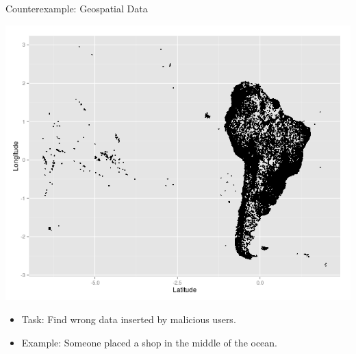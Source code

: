 \documentclass{beamer}
\begin{document}
\begin{frame}{Counterexample: Geospatial Data}
    \begin{center}
    \includegraphics[width=.7\textwidth]{images/south_america.png} 
    \end{center}
    \begin{itemize}
        \item Task: Find wrong data inserted by malicious users.

        \item Example: Someone placed a shop in the middle of the ocean.

    \end{itemize}
\end{frame}
\end{document}
